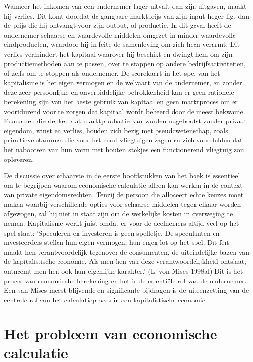 \documentclass[
  a5paper,
  smalldemyvopaper,11pt,twoside,onecolumn,openright,extrafontsizes,
hidelinks]{memoir}
\begin{document}
Wanneer het inkomen van een ondernemer lager uitvalt dan zijn uitgaven,
maakt hij verlies. Dit komt doordat de gangbare marktprijs van zijn
input hoger ligt dan de prijs die hij ontvangt voor zijn output, of
productie. In dit geval heeft de ondernemer schaarse en waardevolle
middelen omgezet in minder waardevolle eindproducten, waardoor hij in
feite de samenleving om zich heen verarmt. Dit verlies vermindert het
kapitaal waarover hij beschikt en dwingt hem om zijn productiemethoden
aan te passen, over te stappen op andere bedrijfsactiviteiten, of zelfs
om te stoppen als ondernemer. De scorekaart in het spel van het
kapitalisme is het eigen vermogen en de welvaart van de ondernemer, en
zonder deze zeer persoonlijke en onverbiddelijke betrokkenheid kan er
geen rationele berekening zijn van het beste gebruik van kapitaal en
geen marktproces om er voortdurend voor te zorgen dat kapitaal wordt
beheerd door de meest bekwame. Economen die denken dat marktproductie
kan worden nagebootst zonder privaat eigendom, winst en verlies, houden
zich bezig met pseudowetenschap, zoals primitieve stammen die voor het
eerst vliegtuigen zagen en zich voorstelden dat het nabootsen van hun
vorm met houten stokjes een functionerend vliegtuig zou opleveren.

De discussie over schaarste in de eerste hoofdstukken van het boek is
essentieel om te begrijpen waarom economische calculatie alleen kan
werken in de context van private eigendomsrechten. Tenzij de persoon die
alloceert echte keuzes moet maken waarbij verschillende opties voor
schaarse middelen tegen elkaar worden afgewogen, zal hij niet in staat
zijn om de werkelijke kosten in overweging te nemen. Kapitalisme werkt
juist omdat er voor de deelnemers altijd veel op het spel staat:
`Speculeren en investeren is geen spelletje. De speculanten en
investeerders stellen hun eigen vermogen, hun eigen lot op het spel. Dit
feit maakt hen verantwoordelijk tegenover de consumenten, de
uiteindelijke bazen van de kapitalistische economie. Als men hen van
deze verantwoordelijkheid ontslaat, ontneemt men hen ook hun eigenlijke
karakter.' (L. von Mises 1998al) Dit is het proces van economische
berekening en het is de essentiële rol van de ondernemer. Een van Mises
meest blijvende en significante bijdragen is de uiteenzetting van de
centrale rol van het calculatieproces in een kapitalistische economie.

\section{Het probleem van economische
calculatie}\label{het-probleem-van-economische-calculatie}
\end{document}

